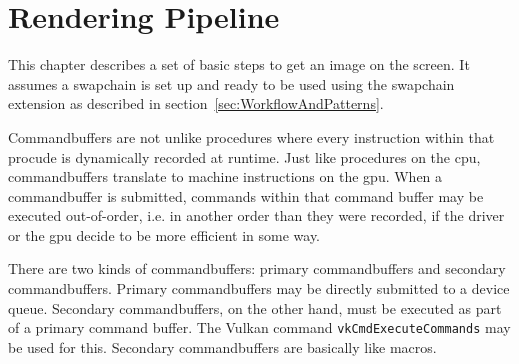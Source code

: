 
\chapter{Rendering Pipeline}
\label{cha:RenderPipeline}


  This chapter describes a set of basic steps to get an image on the screen. It assumes a swapchain is set up and ready to be used using the swapchain extension as described in section~\ref{sec:WorkflowAndPatterns}.


  Commandbuffers are not unlike procedures where every instruction within that procude is dynamically recorded at runtime. Just like procedures on the \gls{cpu}, commandbuffers translate to machine instructions on the \gls{gpu}. When a commandbuffer is submitted, commands within that command buffer may be executed out-of-order, i.e. in another order than they were recorded, if the \gls{driver} or the \gls{gpu} decide to be more efficient in some way.

  There are two kinds of commandbuffers: primary commandbuffers and secondary commandbuffers. Primary commandbuffers may be directly submitted to a device queue. Secondary commandbuffers, on the other hand, must be executed as part of a primary command buffer. The Vulkan command \lstinline{vkCmdExecuteCommands} may be used for this. Secondary commandbuffers are basically like macros.

